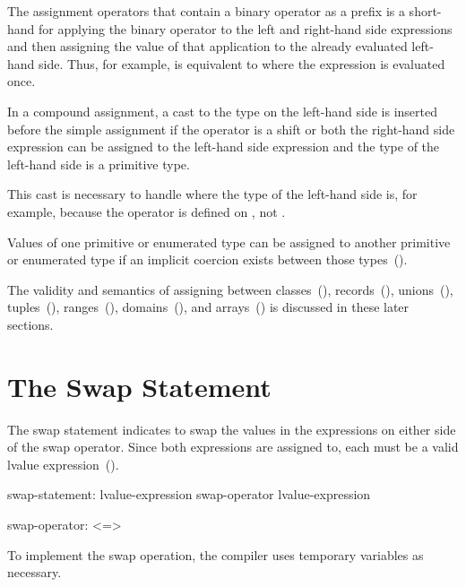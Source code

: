 The assignment operators that contain a binary operator as a prefix is
a short-hand for applying the binary operator to the left and
right-hand side expressions and then assigning the value of that
application to the already evaluated left-hand side.  Thus, for
example,  is equivalent to  where the
expression  is evaluated once.

In a compound assignment, a cast to the type on the left-hand side is
inserted before the simple assignment if the operator is a shift or
both the right-hand side expression can be assigned to the left-hand
side expression and the type of the left-hand side is a primitive
type.

\begin{rationale}
This cast is necessary to handle \chpl{+=} where the type of the
left-hand side is, for example,  because the \chpl{+}
operator is defined on , not .
\end{rationale}

Values of one primitive or enumerated type can be assigned to another
primitive or enumerated type if an implicit coercion exists between
those types~().

The validity and semantics of assigning between
classes~(), records~(),
unions~(), tuples~(),
ranges~(),
domains~(), and arrays~()
is discussed in these later sections.

\section{The Swap Statement}
\label{The_Swap_Statement}
The swap statement indicates to swap the values in the expressions
on either side of the swap operator.  Since both expressions are assigned
to, each must be a valid lvalue expression~().
\begin{syntax}
swap-statement:
  lvalue-expression swap-operator lvalue-expression

swap-operator:
  <=>
\end{syntax}

To implement the swap operation, the compiler uses temporary variables
as necessary.

